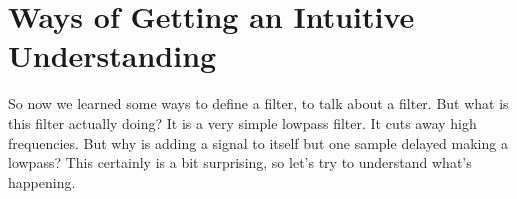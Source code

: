 











\section{Ways of Getting an Intuitive Understanding}

So now we learned some ways to define a filter, to talk about a filter. But what is this filter actually doing? It is a very simple lowpass filter. It cuts away high frequencies. But why is adding a signal to itself but one sample delayed making a lowpass? This certainly is a bit surprising, so let's try to understand what's happening.

